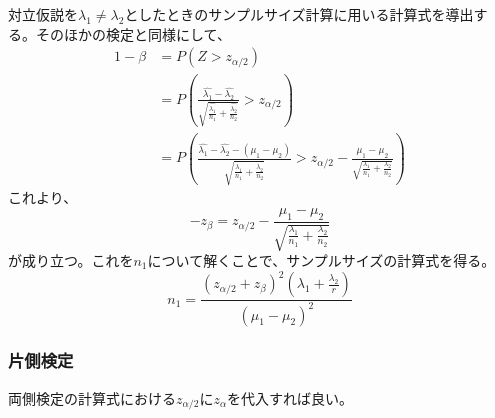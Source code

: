 対立仮説を$\lambda_{1} \neq \lambda_{2}$としたときのサンプルサイズ計算に用いる計算式を導出する。そのほかの検定と同様にして、
\begin{align}
    1 - \beta & = P(Z > z_{\alpha/2})                                                                                                                                                                                                                                                \\
              & = P\left(\frac{\hat{\lambda_{1}} - \hat{\lambda_{2}}}{\sqrt{\frac{\hat{\lambda_{1}}}{n_{1}} + \frac{\hat{\lambda_{2}}}{n_{2}}}} > z_{\alpha/2}\right)                                                                                                                \\
              & = P\left(\frac{\hat{\lambda_{1}} - \hat{\lambda_{2}} - (\mu_{1} - \mu_{2})}{\sqrt{\frac{\hat{\lambda_{1}}}{n_{1}} + \frac{\hat{\lambda_{2}}}{n_{2}}}} > z_{\alpha/2} - \frac{\mu_{1} - \mu_{2}}{\sqrt{\frac{\lambda_{1}}{n_{1}} + \frac{\lambda_{2}}{n_{2}}}}\right)
\end{align}
これより、
\begin{equation}
    -z_{\beta} = z_{\alpha/2} - \frac{\mu_{1} - \mu_{2}}{\sqrt{\frac{\lambda_{1}}{n_{1}} + \frac{\lambda_{2}}{n_{2}}}}
\end{equation}
が成り立つ。これを$n_{1}$について解くことで、サンプルサイズの計算式を得る。
\begin{equation}
    n_{1} = \frac{(z_{\alpha/2} + z_{\beta})^{2}\left(\lambda_{1} + \frac{\lambda_{2}}{r}\right)}{(\mu_{1} - \mu_{2})^{2}}
\end{equation}

\subsubsection{片側検定}
両側検定の計算式における$z_{\alpha/2}$に$z_{\alpha}$を代入すれば良い。

